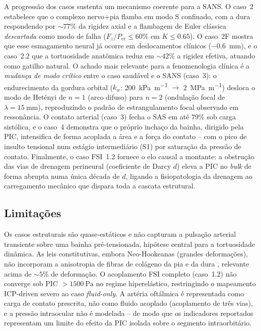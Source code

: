 A progressão dos casos sustenta um mecanismo coerente para a SANS. O caso~2 estabelece que o complexo nervo+pia flamba em modo S confinado, com a dura respondendo por $\sim 77\%$ da rigidez axial e a flambagem de Euler clássica \emph{descartada} como modo de falha ($F_z/P_{\mathrm{cr}} \le 60\%$ em $K \le 0.65$). O caso~2F mostra que esse esmagamento neural já ocorre em deslocamentos clínicos (\SI{-0.6}{\milli\meter}), e o caso~2.2 que a tortuosidade anatômica reduz em $\sim 42\%$ a rigidez efetiva, atuando como gatilho natural. O achado mais relevante para a fenomenologia clínica é a \emph{mudança de modo crítico} entre o caso saudável e o SANS (caso~3): o endurecimento da gordura orbital ($k_w$: \SI{200}{\kilo\pascal\per\meter} $\to$ \SI{2}{\mega\pascal\per \meter}) desloca o modo de Hetényi de $n=1$ (arco difuso) para $n=2$ (ondulação focal de $\lambda = \SI{15}{\milli\meter}$), reproduzindo o padrão de estrangulamento focal observado em ressonância. O contato arterial (caso~3) fecha o SAS em até $79\%$ sob carga sistólica, e o caso~4 demonstra que o próprio inchaço da bainha, dirigido pela PIC, intensifica de forma acoplada a área e a força do contato -- com o pico de insulto tensional num estágio intermediário (S1) por saturação da pressão de contato. Finalmente, o caso FSI~1.2 fornece o elo causal a montante: a obstrução das vias de drenagem perineural (coeficiente de Darcy $d$) eleva a PIC no \emph{bulk} de forma abrupta numa única década de $d$, ligando a fisiopatologia da drenagem ao carregamento mecânico que dispara toda a cascata estrutural.

\subsection*{Limitações}
\label{sec:res-limitacoes}

Os casos estruturais são quase-estáticos e não capturam a pulsação arterial transiente sobre uma bainha pré-tensionada, hipótese central para a tortuosidade dinâmica. As leis constitutivas, embora Neo-Hookeanas (grandes deformações), não incorporam a anisotropia de fibras de colágeno da pia e da dura \citep{Holzapfel2000}, relevante acima de $\sim 5\%$ de deformação. O acoplamento FSI completo (caso~1.2) não converge sob PIC $> \SI{1500}{\pascal}$ no regime hiperelástico, restringindo o mapeamento ICP-driven severo ao caso \emph{fluid-only}. A artéria oftálmica é representada como carga de contato prescrita, não como fluido acoplado (acoplamento de três vias), e a pressão intraocular não é modelada -- de modo que os indicadores reportados representam um limite do efeito da PIC isolada sobre o segmento intraorbitário.
